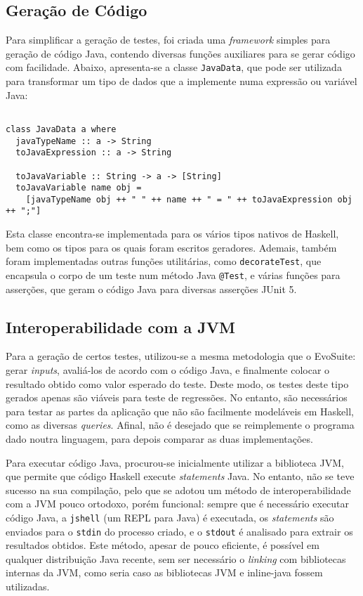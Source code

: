 \documentclass[12pt, a4paper]{article}
\begin{document}
\subsection{Geração de Código}

Para simplificar a geração de testes, foi criada uma \emph{framework} simples para geração de código
Java, contendo diversas funções auxiliares para se gerar código com facilidade. Abaixo, apresenta-se
a classe \texttt{JavaData}, que pode ser utilizada para transformar um tipo de dados que a
implemente numa expressão ou variável Java:

\begin{lstlisting}

class JavaData a where
  javaTypeName :: a -> String
  toJavaExpression :: a -> String

  toJavaVariable :: String -> a -> [String]
  toJavaVariable name obj =
    [javaTypeName obj ++ " " ++ name ++ " = " ++ toJavaExpression obj ++ ";"]
\end{lstlisting}

Esta classe encontra-se implementada para os vários tipos nativos de Haskell, bem como os tipos para
os quais foram escritos geradores. Ademais, também foram implementadas outras funções utilitárias,
como \texttt{decorateTest}, que encapsula o corpo de um teste num método Java \texttt{@Test}, e
várias funções para asserções, que geram o código Java para diversas asserções JUnit 5.

\subsection{Interoperabilidade com a JVM}

Para a geração de certos testes, utilizou-se a mesma metodologia que o EvoSuite: gerar
\emph{inputs}, avaliá-los de acordo com o código Java, e finalmente colocar o resultado obtido como
valor esperado do teste. Deste modo, os testes deste tipo gerados apenas são viáveis para teste de
regressões. No entanto, são necessários para testar as partes da aplicação que não são facilmente
modeláveis em Haskell, como as diversas \emph{queries}. Afinal, não é desejado que se reimplemente o
programa dado noutra linguagem, para depois comparar as duas implementações.

Para executar código Java, procurou-se inicialmente utilizar a biblioteca JVM, que permite que
código Haskell execute \emph{statements} Java. No entanto, não se teve sucesso na sua compilação,
pelo que se adotou um método de interoperabilidade com a JVM pouco ortodoxo, porém funcional: sempre
que é necessário executar código Java, a \texttt{jshell} (um REPL para Java) é executada, os
\emph{statements} são enviados para o \texttt{stdin} do processo criado, e o \texttt{stdout} é
analisado para extrair os resultados obtidos. Este método, apesar de pouco eficiente, é possível em
qualquer distribuição Java recente, sem ser necessário o \emph{linking} com bibliotecas internas da
JVM, como seria caso as bibliotecas JVM e inline-java fossem utilizadas.
\end{document}
